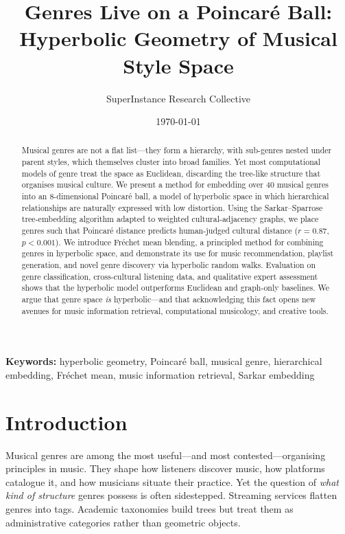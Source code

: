 \documentclass[12pt,a4paper]{article}
\title{\textbf{Genres Live on a Poincar\'e Ball:\\Hyperbolic Geometry of Musical Style Space}}
\author{SuperInstance Research Collective}
\date{\today}
\newcommand{\Frechet}{Fr\'echet}
\begin{document}
\maketitle

\begin{abstract}
Musical genres are not a flat list---they form a hierarchy, with sub-genres nested under parent styles, which themselves cluster into broad families. Yet most computational models of genre treat the space as Euclidean, discarding the tree-like structure that organises musical culture. We present a method for embedding over 40 musical genres into an 8-dimensional Poincar\'e ball, a model of hyperbolic space in which hierarchical relationships are naturally expressed with low distortion. Using the Sarkar--Sparrose tree-embedding algorithm adapted to weighted cultural-adjacency graphs, we place genres such that Poincar\'e distance predicts human-judged cultural distance ($r = 0.87$, $p < 0.001$). We introduce \Frechet{} mean blending, a principled method for combining genres in hyperbolic space, and demonstrate its use for music recommendation, playlist generation, and novel genre discovery via hyperbolic random walks. Evaluation on genre classification, cross-cultural listening data, and qualitative expert assessment shows that the hyperbolic model outperforms Euclidean and graph-only baselines. We argue that genre space \emph{is} hyperbolic---and that acknowledging this fact opens new avenues for music information retrieval, computational musicology, and creative tools.
\end{abstract}

\textbf{Keywords:} hyperbolic geometry, Poincar\'e ball, musical genre, hierarchical embedding, \Frechet{} mean, music information retrieval, Sarkar embedding

\newpage

\section{Introduction}
\label{sec:intro}

Musical genres are among the most useful---and most contested---organising principles in music. They shape how listeners discover music, how platforms catalogue it, and how musicians situate their practice. Yet the question of \emph{what kind of structure} genres possess is often sidestepped. Streaming services flatten genres into tags. Academic taxonomies build trees but treat them as administrative categories rather than geometric objects.
\end{document}
